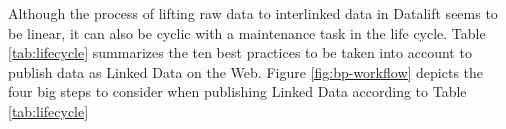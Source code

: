 \begin{figure}
\end{figure}

Although the process of lifting raw data to interlinked data in Datalift seems to be linear, it can also be cyclic with a maintenance task in the life cycle. Table \ref{tab:lifecycle} summarizes the ten best practices to be taken into account to publish data as Linked Data on the Web. Figure \ref{fig:bp-workflow} depicts the four big steps to consider when publishing Linked Data according to Table \ref{tab:lifecycle}

